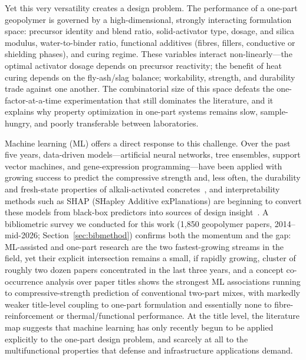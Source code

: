 \documentclass[materials,article,submit,pdftex,moreauthors]{Definitions/mdpi}
\begin{document}
Yet this very versatility creates a design problem. The performance of a one-part geopolymer is governed by a high-dimensional, strongly interacting formulation space: precursor identity and blend ratio, solid-activator type, dosage, and silica modulus, water-to-binder ratio, functional additives (fibres, fillers, conductive or shielding phases), and curing regime. These variables interact non-linearly---the optimal activator dosage depends on precursor reactivity; the benefit of heat curing depends on the fly-ash/slag balance; workability, strength, and durability trade against one another. The combinatorial size of this space defeats the one-factor-at-a-time experimentation that still dominates the literature, and it explains why property optimization in one-part systems remains slow, sample-hungry, and poorly transferable between laboratories.

Machine learning (ML) offers a direct response to this challenge. Over the past five years, data-driven models---artificial neural networks, tree ensembles, support vector machines, and gene-expression programming---have been applied with growing success to predict the compressive strength and, less often, the durability and fresh-state properties of alkali-activated concretes~\cite{ref1,ref2,ref3,ref8}, and interpretability methods such as SHAP (SHapley Additive exPlanations) are beginning to convert these models from black-box predictors into sources of design insight~\cite{ref25,ref38}. A bibliometric survey we conducted for this work (1,850 geopolymer papers, 2014--mid-2026; Section~\ref{sec:bibmethod}) confirms both the momentum and the gap: ML-assisted and one-part research are the two fastest-growing streams in the field, yet their explicit intersection remains a small, if rapidly growing, cluster of roughly two dozen papers concentrated in the last three years, and a concept co-occurrence analysis over paper titles shows the strongest ML associations running to compressive-strength prediction of conventional two-part mixes, with markedly weaker title-level coupling to one-part formulation and essentially none to fibre-reinforcement or thermal/functional performance. At the title level, the literature map suggests that machine learning has only recently begun to be applied explicitly to the one-part design problem, and scarcely at all to the multifunctional properties that defense and infrastructure applications demand.
\end{document}
